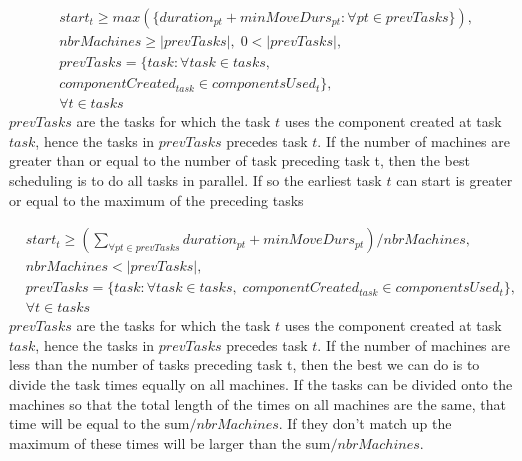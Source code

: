 \documentclass[10pt,a4paper]{report}
\begin{document}
\begin{equation}
\begin{aligned}\label{eq:70}
&start_t \ge max(\{duration_{pt} + minMoveDurs_{pt} : \forall pt \in prevTasks\}), \\
&nbrMachines \ge |prevTasks|, \; 0 < |prevTasks|,\\
&prevTasks = \{task : \forall task \in tasks,\\
&componentCreated_{task} \in componentsUsed_t\},\\
&\forall t \in tasks
\end{aligned}
\end{equation}
$prevTasks$ are the tasks for which the task $t$ uses the component created at task $task$, hence the tasks in $prevTasks$ precedes task $t$. If the number of machines are greater than or equal to the number of task preceding task t, then the best scheduling is to do all tasks in parallel. If so the earliest task $t$ can start is greater or equal to the maximum of the preceding tasks

\begin{equation}
\begin{aligned}\label{eq:71}
&start_t \ge \left(\sum_{\forall pt \in prevTasks}duration_{pt} + minMoveDurs_{pt}\right) / nbrMachines, \\
&nbrMachines < |prevTasks|,  \\
&prevTasks = \{task : \forall task \in tasks, \; componentCreated_{task} \in componentsUsed_t\}, \\
&\forall t \in tasks
\end{aligned}
\end{equation}
$prevTasks$ are the tasks for which the task $t$ uses the component created at task $task$, hence the tasks in $prevTasks$ precedes task $t$. If the number of machines are less than the number of tasks preceding task t, then the best we can do is to divide the task times equally on all machines. If the tasks can be divided onto the machines so that the total length of the times on all machines are the same, that time will be equal to the sum$/nbrMachines$. If they don't match up the maximum of these times will be larger than the sum$/nbrMachines$.
\end{document}
